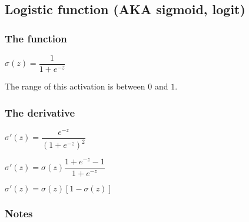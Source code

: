 
\subsection{Logistic function (AKA sigmoid, logit)}

\subsubsection{The function}

\(\sigma (z)=\dfrac{1}{1+e^{-z}}\)

The range of this activation is between \(0\) and \(1\).

\subsubsection{The derivative}

\(\sigma '(z)=\dfrac{e^{-z}}{(1+e^{-z})^2}\)

\(\sigma '(z)=\sigma (z)\dfrac{1+e^{-z}-1}{1+e^{-z}}\)

\(\sigma '(z)=\sigma (z)[1-\sigma (z)]\)

\subsubsection{Notes}


